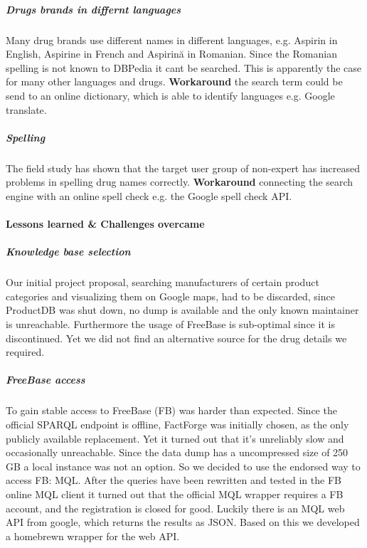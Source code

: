 \documentclass[11pt,titlepage,oneside,openany]{book}
\begin{document}
\subparagraph{Drugs brands in differnt languages}
\label{drug_foregin_name}
Many drug brands use different names in different languages, e.g. Aspirin in English, Aspirine in French and Aspirin\u{a} in Romanian. Since the Romanian spelling is not known to DBPedia it cant be searched. This is apparently the case for many other languages and drugs. \textbf{Workaround} the search term could be send to an online dictionary, which is able to identify languages e.g. Google translate.

\subparagraph{Spelling}
\label{drug_spellcheck}
The field study has shown that the target user group of non-expert has increased problems in spelling drug names correctly. \textbf{Workaround} connecting the search engine with an online spell check e.g. the Google spell check API.



\paragraph{Lessons learned \& Challenges overcame}
\label{cha:lessons}

\label{challenges}

\subparagraph{Knowledge base selection} Our initial project proposal, searching manufacturers of certain product categories and visualizing them on Google maps, had to be discarded, since ProductDB was shut down, no dump is available and the only known maintainer is unreachable. Furthermore the usage of FreeBase is sub-optimal since it is discontinued. Yet we did not find an alternative source for the drug details we required. 


\subparagraph{FreeBase access}
\label{challenges:fb}
To gain stable access to FreeBase (FB) was harder than expected. Since the official SPARQL endpoint is offline, FactForge was initially chosen, as the only publicly available replacement. Yet it turned out that it's unreliably slow and occasionally unreachable. Since the data dump has a uncompressed size of 250 GB a local instance was not an option. 
So we decided to use the endorsed way to access FB: MQL. After the queries have been rewritten and tested in the FB online MQL client it turned out that the official MQL wrapper requires a FB account, and the registration is closed for good.
Luckily there is an MQL web API from google, which returns the results as JSON. Based on this we developed a homebrewn wrapper for the web API.



\appendix

\newpage
\end{document}
